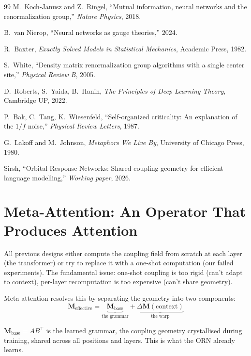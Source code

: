 \documentclass[11pt, a4paper]{article}
\newcommand{\M}{\mathbf{M}}
\theoremstyle{plain}
\theoremstyle{definition}
\theoremstyle{remark}
\begin{document}
\begin{thebibliography}{99}
M.~Koch-Janusz and Z.~Ringel,
``Mutual information, neural networks and the renormalization group,''
\emph{Nature Physics}, 2018.

B.~van Nierop,
``Neural networks as gauge theories,''
2024.

R.~Baxter,
\emph{Exactly Solved Models in Statistical Mechanics},
Academic Press, 1982.

S.~White,
``Density matrix renormalization group algorithms with a single center site,''
\emph{Physical Review B}, 2005.

D.~Roberts, S.~Yaida, B.~Hanin,
\emph{The Principles of Deep Learning Theory},
Cambridge UP, 2022.

P.~Bak, C.~Tang, K.~Wiesenfeld,
``Self-organized criticality: An explanation of the $1/f$ noise,''
\emph{Physical Review Letters}, 1987.

G.~Lakoff and M.~Johnson,
\emph{Metaphors We Live By},
University of Chicago Press, 1980.

Sirsh,
``Orbital Response Networks: Shared coupling geometry for efficient language modelling,''
\emph{Working paper}, 2026.

\end{thebibliography}


\appendix
\section{Meta-Attention: An Operator That Produces Attention}
\label{sec:meta-attention}

All previous designs either compute the coupling field from scratch at each layer (the transformer) or try to replace it with a one-shot computation (our failed experiments).
The fundamental issue: one-shot coupling is too rigid (can't adapt to context), per-layer recomputation is too expensive (can't share geometry).

Meta-attention resolves this by separating the geometry into two components:
\begin{equation}
\M_{\mathrm{effective}} = \underbrace{\M_{\mathrm{base}}}_{\text{the grammar}} + \underbrace{\Delta\M(\mathrm{context})}_{\text{the warp}}
\end{equation}

$\M_{\mathrm{base}} = AB^\top$ is the learned grammar, the coupling geometry crystallised during training, shared across all positions and layers.
This is what the ORN already learns.
\end{document}
